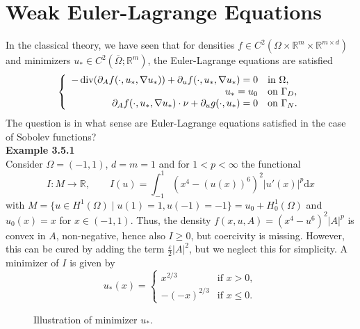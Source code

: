 \section{Weak Euler-Lagrange Equations}
In the classical theory, we have seen that for densities $f\in C^2(\Omega\times\mathbb{R}^m\times\mathbb{R}^{m\times d})$ and minimizers $u_*\in C^2(\overline{\Omega};\mathbb{R}^m)$, the Euler-Lagrange equations are satisfied
\[\left\{\begin{array}{rl}
	-\operatorname{div}\mathopen{}\left(\partial_Af(\cdot,u_*,\nabla u_*)\right)\mathclose{}+\partial_uf(\cdot,u_*,\nabla u_*)=0&\text{in }\Omega,\\
	u_*=u_0&\text{on }\Gamma_D,\\
	\partial_Af(\cdot,u_*,\nabla u_*)\cdot\nu+\partial_ug(\cdot,u_*)=0&\text{on }\Gamma_N.
\end{array}\right.\]
The question is in what sense are Euler-Lagrange equations satisfied in the case of Sobolev functions?\\[11pt]

\textbf{Example 3.5.1}\\
Consider $\Omega=(-1,1)$, $d=m=1$ and for $1<p<\infty$ the functional
\[I:M\longrightarrow\mathbb{R},\qquad I(u)=\int_{-1}^1{(x^4-(u(x))^6)^2\lvert u'(x)\rvert^p\mathrm{d}x}\]
with $M=\{u\in H^1(\Omega)\mid u(1)=1,u(-1)=-1\}=u_0+H_0^1(\Omega)$ and $u_0(x)=x$ for $x\in(-1,1)$. Thus, the density $f(x,u,A)=(x^4-u^6)^2\lvert A\rvert^p$ is convex in $A$, non-negative, hence also $I\geq0$, but coercivity is missing. However, this can be cured by adding the term $\frac{\varepsilon}{2}\lvert A\rvert^2$, but we neglect this for simplicity. A minimizer of $I$ is given by
\[u_*(x)=\left\{\begin{array}{rl}
	x^{2/3}&\text{if }x>0,\\
	-(-x)^{2/3}&\text{if }x\leq0.
\end{array}\right.\]

\begin{figure}[ht]
	\centering
	\caption{Illustration of minimizer $u_*$.}
\end{figure}


